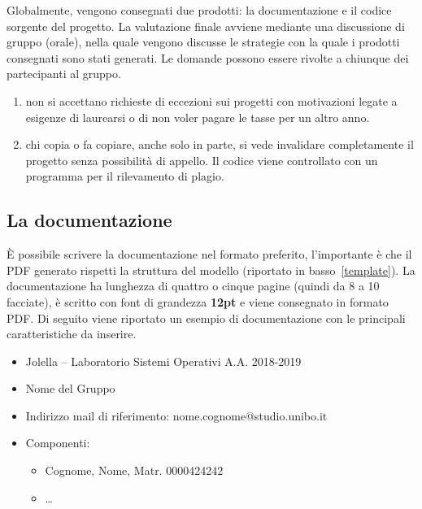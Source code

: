 
Globalmente, vengono consegnati due prodotti: la documentazione e il codice
sorgente del progetto. La valutazione finale avviene mediante una discussione di
gruppo (orale), nella quale vengono discusse le strategie con la quale i
prodotti consegnati sono stati generati. Le domande possono essere rivolte a
chiunque dei partecipanti al gruppo.

\begin{tcolorbox}[colback=yellow!20!white,colframe=yellow!75!black,title=\textbf{N.B.}]

 \begin{enumerate}

  \item non si accettano richieste di eccezioni sui progetti con motivazioni
        legate a esigenze di laurearsi o di non voler pagare le tasse per un altro
        anno.

  \item chi copia o fa copiare, anche solo in parte, si vede invalidare
        completamente il progetto senza possibilità di appello. Il codice viene
        controllato con un programma per il rilevamento di plagio.

 \end{enumerate}

\end{tcolorbox}

\subsection{La documentazione}

È possibile scrivere la documentazione nel formato preferito, l'importante è che
il PDF generato rispetti la struttura del modello (riportato in
basso~\ref{template}). La documentazione ha lunghezza di quattro o cinque pagine
(quindi da 8 a 10 facciate), è scritto con font di grandezza \textbf{12pt} e
viene consegnato in formato PDF. Di seguito viene riportato un esempio di
documentazione con le principali caratteristiche da inserire.

\begin{tcolorbox}[colback=green!20!white,colframe=green!75!black,title=L'intestazione della Documentazione]
 \label{template}
 \begin{itemize}
  \item Jolella -- Laboratorio Sistemi Operativi A.A. 2018-2019
  \item Nome del Gruppo
  \item Indirizzo mail di riferimento: nome.cognome@studio.unibo.it
  \item Componenti:
        \begin{itemize}
         \item Cognome, Nome, Matr. 0000424242
         \item \dots
        \end{itemize}
 \end{itemize}
\end{tcolorbox}

